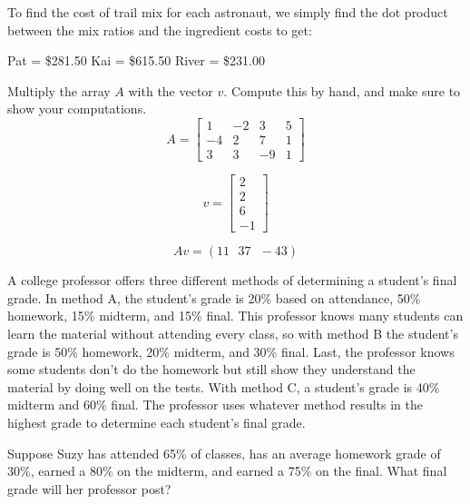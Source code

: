 To find the cost of trail mix for each astronaut, we simply find the dot product between the mix ratios and the ingredient costs to get:

Pat =  \$281.50 \newline
Kai =  \$615.50 \newline
River = \$231.00 \newline


\begin{Exercise}[title={Vector Matrix Multiplication}, label=vector-matrix-multiply01]
Multiply the array $A$ with the vector $v$. Compute this by hand, and make sure to show your computations. 
$$A = \begin{bmatrix}
1 & -2 & 3 & 5  \\
-4 & 2 & 7 & 1 \\
3 & 3  & -9 & 1
\end{bmatrix}$$

$$v = 
\begin{bmatrix}
 2 \\
 2 \\
 6 \\
 -1
 \end{bmatrix}$$
\end{Exercise}

\begin{Answer}[ref=vector-matrix-multiply01]
$$Av = (11 \text{ }37 \text{ } -43)$$
\end{Answer}

\begin{Exercise}[title = {Using Vector Matrix Multiplication}, label = vmm02]
A college professor offers three different methods of determining a student's final grade. In method A, the student's grade is 20\% based on attendance, 50\% homework, 15\% midterm, and 15\% final. This professor knows many students can learn the material without attending every class, so with method B the student's grade is 50\% homework, 20\% midterm, and 30\% final. Last, the professor knows some students don't do the homework but still show they understand the material by doing well on the tests. With method C, a student's grade is 40\% midterm and 60\% final. The professor uses whatever method results in the highest grade to determine each student's final grade. 

Suppose Suzy has attended 65\% of classes, has an average homework grade of 30\%, earned a 80\% on the midterm, and earned a 75\% on the final. What final grade will her professor post?
\end{Exercise}

